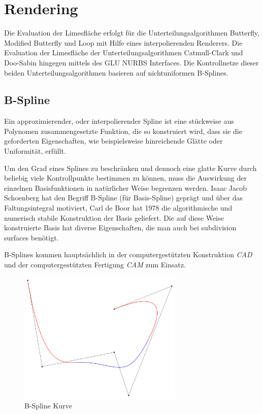 \section{Rendering} \label{sec:rendering}
Die Evaluation der Limesfläche erfolgt für die Unterteilungsalgorithmen Butterfly, Modified Butterfly und Loop mit Hilfe eines interpolierenden Renderers.
Die Evaluation der Limesfläche der Unterteilungsalgorithmen Catmull-Clark und Doo-Sabin hingegen mittels des GLU NURBS Interfaces.
Die Kontrollnetze dieser beiden Unterteilungsalgorithmen basieren auf nichtuniformen B-Splines.

\subsection{B-Spline}
Ein approximierender, oder interpolierender Spline ist eine stückweise aus Polynomen zusammengesetzte Funktion, die so konstruiert wird, dass sie die geforderten Eigenschaften, wie beispielsweise hinreichende Glätte oder Uniformität, erfüllt.

Um den Grad eines Splines zu beschränken und dennoch eine glatte Kurve durch beliebig viele Kontrollpunkte bestimmen zu können, muss die Auswirkung der einzelnen Basisfunktionen in natürlicher Weise begrenzen werden.
Isaac Jacob Schoenberg hat den Begriff B-Spline (für Basis-Spline) geprägt und über das Faltungsintegral motiviert, Carl de Boor hat 1978 die algorithmische und numerisch stabile Konstruktion der Basis geliefert.
Die auf diese Weise konstruierte Basis hat diverse Eigenschaften, die man auch bei subdivision surfaces benötigt. \cite{kroemker:2008}

B-Splines kommen hauptsächlich in der computergestützten Konstruktion \textit{CAD} und der computergestützten Fertigung \textit{CAM} zum Einsatz.

\begin{figure}[h]
  \centering
  \includegraphics[width=0.7\textwidth]{content/media/b-spline_curve.png}
  \caption{B-Spline Kurve \cite{b-spline:2016}}
  \label{fig:b-spline}
\end{figure}


